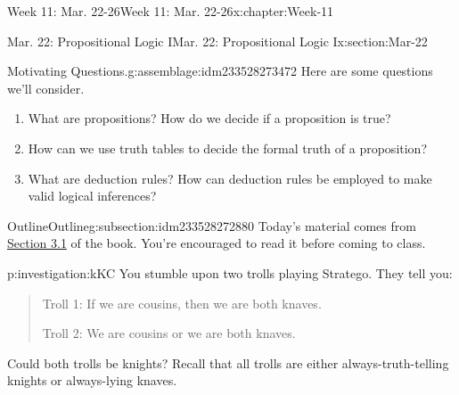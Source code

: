 \documentclass[oneside,10pt,]{book}
\numberwithin{equation}{section}
\begin{document}
%
%
\typeout{************************************************}
\typeout{************************************************}
%
\begin{chapterptx}{Week 11: Mar. 22-26}{}{Week 11: Mar. 22-26}{}{}{x:chapter:Week-11}
%
%
\typeout{************************************************}
\typeout{************************************************}
%
\begin{sectionptx}{Mar. 22: Propositional Logic I}{}{Mar. 22: Propositional Logic I}{}{}{x:section:Mar-22}
\begin{introduction}{}%
\begin{assemblage}{Motivating Questions.}{g:assemblage:idm233528273472}%
Here are some questions we'll consider. %
\begin{enumerate}
\item{}What are propositions? How do we decide if a proposition is true?%
\item{}How can we use truth tables to decide the formal truth of a proposition?%
\item{}What are deduction rules? How can deduction rules be employed to make valid logical inferences?%
\end{enumerate}
%
\end{assemblage}
\end{introduction}%
%
%
\typeout{************************************************}
\typeout{************************************************}
%
\begin{subsectionptx}{Outline}{}{Outline}{}{}{g:subsection:idm233528272880}
Today's material comes from \href{http://discrete.openmathbooks.org/dmoi3/sec_propositional.html}{Section 3.1} of the book. You're encouraged to read it before coming to class.%
\begin{investigation}{}{p:investigation:kKC}%
%
%
%
%
You stumble upon two trolls playing Stratego\textregistered{}. They tell you:%
\begin{quote}%
Troll 1: If we are cousins, then we are both knaves.%
\par
Troll 2: We are cousins or we are both knaves.%
\end{quote}
Could both trolls be knights? Recall that all trolls are either always-truth-telling knights or always-lying knaves.%
\end{investigation}%

\end{subsectionptx}
\end{sectionptx}
\end{chapterptx}
\end{document}
